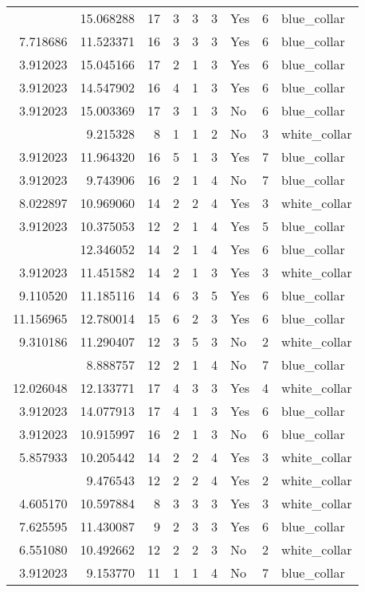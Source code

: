 \documentclass[
]{article}
\begin{document}
\begin{longtable}[t]{rrrrrllrl}
\addlinespace
13.815561 & 15.068288 & 17 & 3 & 3 & 3 & Yes & 6 & blue\_collar\\
7.718686 & 11.523371 & 16 & 3 & 3 & 3 & Yes & 6 & blue\_collar\\
3.912023 & 15.045166 & 17 & 2 & 1 & 3 & Yes & 6 & blue\_collar\\
3.912023 & 14.547902 & 16 & 4 & 1 & 3 & Yes & 6 & blue\_collar\\
3.912023 & 15.003369 & 17 & 3 & 1 & 3 & No & 6 & blue\_collar\\
\addlinespace
3.912023 & 9.215328 & 8 & 1 & 1 & 2 & No & 3 & white\_collar\\
3.912023 & 11.964320 & 16 & 5 & 1 & 3 & Yes & 7 & blue\_collar\\
3.912023 & 9.743906 & 16 & 2 & 1 & 4 & No & 7 & blue\_collar\\
8.022897 & 10.969060 & 14 & 2 & 2 & 4 & Yes & 3 & white\_collar\\
3.912023 & 10.375053 & 12 & 2 & 1 & 4 & Yes & 5 & blue\_collar\\
\addlinespace
3.912023 & 12.346052 & 14 & 2 & 1 & 4 & Yes & 6 & blue\_collar\\
3.912023 & 11.451582 & 14 & 2 & 1 & 3 & Yes & 3 & white\_collar\\
9.110520 & 11.185116 & 14 & 6 & 3 & 5 & Yes & 6 & blue\_collar\\
11.156965 & 12.780014 & 15 & 6 & 2 & 3 & Yes & 6 & blue\_collar\\
9.310186 & 11.290407 & 12 & 3 & 5 & 3 & No & 2 & white\_collar\\
\addlinespace
3.912023 & 8.888757 & 12 & 2 & 1 & 4 & No & 7 & blue\_collar\\
12.026048 & 12.133771 & 17 & 4 & 3 & 3 & Yes & 4 & white\_collar\\
3.912023 & 14.077913 & 17 & 4 & 1 & 3 & Yes & 6 & blue\_collar\\
3.912023 & 10.915997 & 16 & 2 & 1 & 3 & No & 6 & blue\_collar\\
5.857933 & 10.205442 & 14 & 2 & 2 & 4 & Yes & 3 & white\_collar\\
\addlinespace
4.499810 & 9.476543 & 12 & 2 & 2 & 4 & Yes & 2 & white\_collar\\
4.605170 & 10.597884 & 8 & 3 & 3 & 3 & Yes & 3 & white\_collar\\
7.625595 & 11.430087 & 9 & 2 & 3 & 3 & Yes & 6 & blue\_collar\\
6.551080 & 10.492662 & 12 & 2 & 2 & 3 & No & 2 & white\_collar\\
3.912023 & 9.153770 & 11 & 1 & 1 & 4 & No & 7 & blue\_collar\\

\end{longtable}
\end{document}
